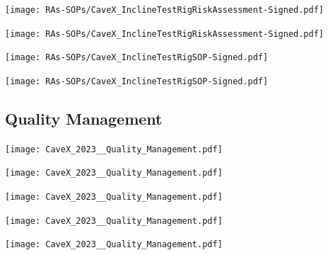 \texttt{[image: RAs-SOPs/CaveX\_InclineTestRigRiskAssessment-Signed.pdf]}

\texttt{[image: RAs-SOPs/CaveX\_InclineTestRigRiskAssessment-Signed.pdf]}

\texttt{[image: RAs-SOPs/CaveX\_InclineTestRigSOP-Signed.pdf]}

\texttt{[image: RAs-SOPs/CaveX\_InclineTestRigSOP-Signed.pdf]}

\newpage
\subsection{Quality Management}
\label{app:qualityplan}

\texttt{[image: CaveX\_2023\_\_Quality\_Management.pdf]}

\texttt{[image: CaveX\_2023\_\_Quality\_Management.pdf]}

\texttt{[image: CaveX\_2023\_\_Quality\_Management.pdf]}

\texttt{[image: CaveX\_2023\_\_Quality\_Management.pdf]}

\texttt{[image: CaveX\_2023\_\_Quality\_Management.pdf]}